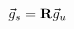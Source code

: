 \vspace{-0.1cm}
\begin{equation}
    \vec{g}_s = \mathbf{R} \vec{g}_u
    \label{eq:forward-pass}
    \vspace{-0.05cm}
\end{equation}